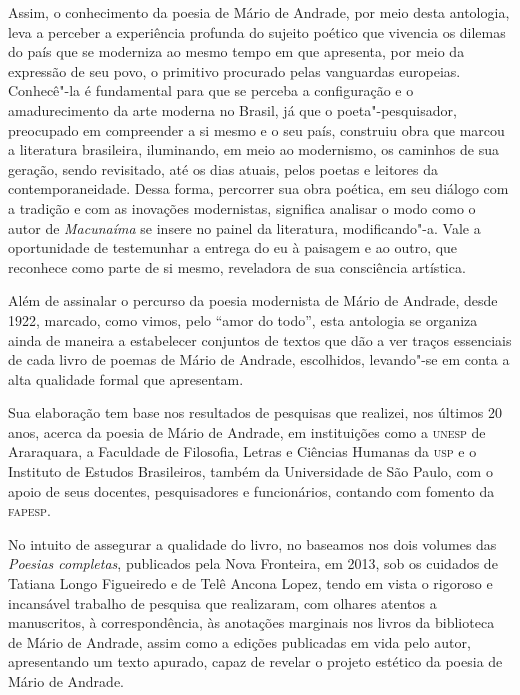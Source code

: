 Assim, o conhecimento da poesia de Mário de Andrade, por meio desta
antologia, leva a perceber a experiência profunda do sujeito poético que
vivencia os dilemas do país que se moderniza ao mesmo tempo em que
apresenta, por meio da expressão de seu povo, o primitivo procurado
pelas vanguardas europeias. Conhecê"-la é fundamental para que se perceba
a configuração e o amadurecimento da arte moderna no Brasil, já que o
poeta"-pesquisador, preocupado em compreender a si mesmo e o seu país,
construiu obra que marcou a literatura brasileira, iluminando, em meio
ao modernismo, os caminhos de sua geração, sendo revisitado, até os dias
atuais, pelos poetas e leitores da contemporaneidade. Dessa forma,
percorrer sua obra poética, em seu diálogo com a tradição e com as
inovações modernistas, significa analisar o modo como o autor de
\emph{Macunaíma} se insere no painel da literatura, modificando"-a. Vale
a oportunidade de testemunhar a entrega do eu à paisagem e ao outro, que
reconhece como parte de si mesmo, reveladora de sua consciência
artística.


Além de assinalar o percurso da poesia modernista de Mário de Andrade,
desde 1922, marcado, como vimos, pelo ``amor do todo'', esta antologia
se organiza ainda de maneira a estabelecer conjuntos de textos que dão a
ver traços essenciais de cada livro de poemas de Mário de Andrade,
escolhidos, levando"-se em conta a alta qualidade formal que apresentam.

Sua elaboração tem base nos resultados de pesquisas que realizei, nos
últimos 20 anos, acerca da poesia de Mário de Andrade, em instituições
como a \textsc{unesp} de Araraquara, a Faculdade de Filosofia, Letras e Ciências
Humanas da \textsc{usp} e o Instituto de Estudos Brasileiros, também da
Universidade de São Paulo, com o apoio de seus docentes, pesquisadores e
funcionários, contando com fomento da \textsc{fapesp}.

No intuito de assegurar a qualidade do livro, no baseamos nos dois
volumes das \emph{Poesias completas}, publicados pela Nova Fronteira, em
2013, sob os cuidados de Tatiana Longo Figueiredo e de Telê Ancona
Lopez, tendo em vista o rigoroso e incansável trabalho de pesquisa que
realizaram, com olhares atentos a manuscritos, à correspondência, às
anotações marginais nos livros da biblioteca de Mário de Andrade, assim
como a edições publicadas em vida pelo autor, apresentando um texto
apurado, capaz de revelar o projeto estético da poesia de Mário de
Andrade.


